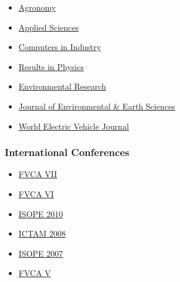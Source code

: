 \documentclass[final, a4paper, oneside, 12pt]{article}
\numberwithin{equation}{section}
\begin{document}
\begin{itemize}
    \item \href{https://www.mdpi.com/journal/agronomy/}{Agronomy}

    \item \href{https://www.mdpi.com/journal/applsci/}{Applied Sciences}
    
    \item \href{https://www.sciencedirect.com/journal/computers-in-industry/}{Computers in Industry}

    \item \href{https://www.sciencedirect.com/journal/results-in-physics/}{Results in Physics}

    \item \href{https://www.sciencedirect.com/journal/environmental-research/ }{Environmental Research}
    
    \item \href{https://journals.bilpubgroup.com/index.php/jees/}{Journal of Environmental \& Earth Sciences}

    \item \href{https://www.mdpi.com/journal/wevj/}{World Electric Vehicle Journal}
    
\end{itemize}

\subsubsection{International Conferences}

  \begin{itemize}
  
    \item \href{http://www.wias-berlin.de/workshops/fvca7/}{FVCA VII}
    
    \item \href{http://fvca6.fs.cvut.cz/}{FVCA VI}
    
    \item \href{http://www.isope2010.org/}{ISOPE 2010}
    
    \item \href{http://ictam2008.adelaide.edu.au/}{ICTAM 2008}
    
    \item \href{http://www.isope.org/conferences/conferences.htm}{ISOPE 2007}
    
    \item \href{http://www.latp.univ-mrs.fr/fvca5/}{FVCA V}
    
  \end{itemize}
  
\end{document}
